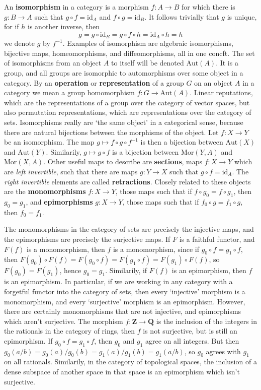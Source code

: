 An {\bf isomorphism} in a category is a morphism $f:A \to B$ for which there is $g: B \to A$ such that $g \circ f = \text{id}_A$ and $f \circ g = \text{id}_B$. It follows trivially that $g$ is unique, for if $h$ is another inverse, then
%
\[ g = g \circ \text{id}_B = g \circ f \circ h = \text{id}_A \circ h = h \]
%
we denote $g$ by $f^{-1}$. Examples of isomorphism are algebraic isomorphisms, bijective maps, homeomorphisms, and diffeomorphisms, all in one concft. The set of isomorphisms from an object $A$ to itself will be denoted $\text{Aut}(A)$. It is a group, and all groups are isomorphic to automorphisms over some object in a category. By an {\bf operation} or {\bf representation} of a group $G$ on an object $A$ in a category we mean a group homomorphism $f: G \to \text{Aut}(A)$. Linear reputations, which are the representations of a group over the category of vector spaces, but also permutation representations, which are representations over the category of sets. Isomorphisms really are `the same object' in a categorical sense, because there are natural bijections between the morphisms of the object. Let $f: X \to Y$ be an isomorphism. The map $g \mapsto f \circ g \circ f^{-1}$ is then a bijection between $\text{Aut}(X)$ and $\text{Aut}(Y)$. Similarily, $g \mapsto g \circ f$ is a bijection between $\text{Mor}(Y,A)$ and $\text{Mor}(X,A)$. Other useful maps to describe are {\bf sections}, maps $f: X \to Y$ which are {\it left invertible}, such that there are maps $g: Y \to X$ such that $g \circ f = \text{id}_A$. The {\it right invertible} elements are called {\bf retractions}. Closely related to these objects are the {\bf monomorphisms} $f: X \to Y$, those maps such that if $f \circ g_0 = f \circ g_1$, then $g_0 = g_1$, and {\bf epimorphisms} $g: X \to Y$, those maps such that if $f_0 \circ g = f_1 \circ g$, then $f_0 = f_1$.

\begin{example}
    The monomorphisms in the category of sets are precisely the injective maps, and the epimorphisms are precisely the surjective maps. If $F$ is a faithful functor, and $F(f)$ is a monomorphism, then $f$ is a monomorphism, since if $g_0 \circ f = g_1 \circ f$, then $F(g_0) \circ F(f) = F(g_0 \circ f) = F(g_1 \circ f) = F(g_1) \circ F(f)$, so $F(g_0) = F(g_1)$, hence $g_0 = g_1$. Similarily, if $F(f)$ is an epimorphism, then $f$ is an epimorphism. In particular, if we are working in any category with a forgetful functor into the category of sets, then every `injective' morphism is a monomorphism, and every `surjective' morphism is an epimorphism. However, there are certainly monomorphisms that are not injective, and epimorphisms which aren't surjective. The morphism $f: \mathbf{Z} \to \mathbf{Q}$ is the inclusion of the integers in the rationals in the category of rings, then $f$ is not surjective, but is still an epimorphism. If $g_0 \circ f = g_1 \circ f$, then $g_0$ and $g_1$ agree on all integers. But then $g_0(a/b) = g_0(a)/g_0(b) = g_1(a)/g_1(b) = g_1(a/b)$, so $g_0$ agrees with $g_1$ on all rationals. Similarily, in the category of topological spaces, the inclusion of a dense subspace of another space in that space is an epimorphism which isn't surjective.
\end{example}

